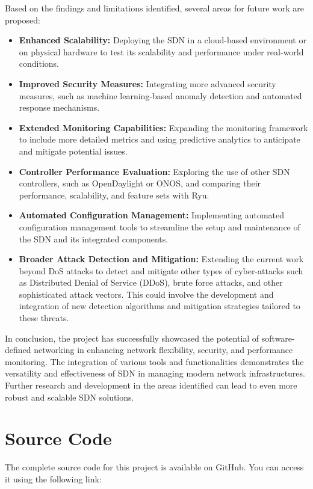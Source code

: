 \documentclass[a4paper,12pt]{article}
\begin{document}
Based on the findings and limitations identified, several areas for future work are proposed:
\begin{itemize}
    \item \textbf{Enhanced Scalability:} Deploying the SDN in a cloud-based environment or on physical hardware to test its scalability and performance under real-world conditions.
    \item \textbf{Improved Security Measures:} Integrating more advanced security measures, such as machine learning-based anomaly detection and automated response mechanisms.
    \item \textbf{Extended Monitoring Capabilities:} Expanding the monitoring framework to include more detailed metrics and using predictive analytics to anticipate and mitigate potential issues.
    \item \textbf{Controller Performance Evaluation:} Exploring the use of other SDN controllers, such as OpenDaylight or ONOS, and comparing their performance, scalability, and feature sets with Ryu.
    \item \textbf{Automated Configuration Management:} Implementing automated configuration management tools to streamline the setup and maintenance of the SDN and its integrated components.
    \item \textbf{Broader Attack Detection and Mitigation:} Extending the current work beyond DoS attacks to detect and mitigate other types of cyber-attacks such as Distributed Denial of Service (DDoS), brute force attacks, and other sophisticated attack vectors. This could involve the development and integration of new detection algorithms and mitigation strategies tailored to these threats.
\end{itemize}

In conclusion, the project has successfully showcased the potential of software-defined networking in enhancing network flexibility, security, and performance monitoring. The integration of various tools and functionalities demonstrates the versatility and effectiveness of SDN in managing modern network infrastructures. Further research and development in the areas identified can lead to even more robust and scalable SDN solutions.




\section{Source Code}

The complete source code for this project is available on GitHub. You can access it using the following link:
\end{document}
